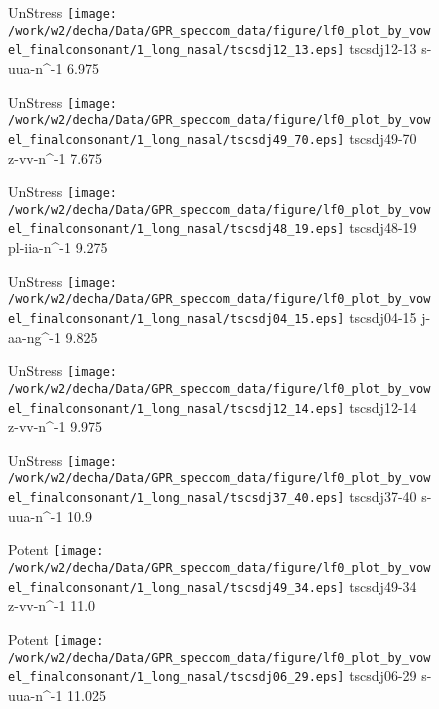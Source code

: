\documentclass{article}
\begin{document}
\begin{figure}[t]
\begin{minipage}[b]{.24\textwidth}
UnStress
\centering
\texttt{[image: /work/w2/decha/Data/GPR\_speccom\_data/figure/lf0\_plot\_by\_vowel\_finalconsonant/1\_long\_nasal/tscsdj12\_13.eps]}
tscsdj12-13 s-uua-n\textasciicircum-1 6.975
\end{minipage}
\begin{minipage}[b]{.24\textwidth}
UnStress
\centering
\texttt{[image: /work/w2/decha/Data/GPR\_speccom\_data/figure/lf0\_plot\_by\_vowel\_finalconsonant/1\_long\_nasal/tscsdj49\_70.eps]}
tscsdj49-70 z-vv-n\textasciicircum-1 7.675
\end{minipage}
\begin{minipage}[b]{.24\textwidth}
UnStress
\centering
\texttt{[image: /work/w2/decha/Data/GPR\_speccom\_data/figure/lf0\_plot\_by\_vowel\_finalconsonant/1\_long\_nasal/tscsdj48\_19.eps]}
tscsdj48-19 pl-iia-n\textasciicircum-1 9.275
\end{minipage}
\begin{minipage}[b]{.24\textwidth}
UnStress
\centering
\texttt{[image: /work/w2/decha/Data/GPR\_speccom\_data/figure/lf0\_plot\_by\_vowel\_finalconsonant/1\_long\_nasal/tscsdj04\_15.eps]}
tscsdj04-15 j-aa-ng\textasciicircum-1 9.825
\end{minipage}
\end{figure}

\begin{figure}[t]
\begin{minipage}[b]{.24\textwidth}
UnStress
\centering
\texttt{[image: /work/w2/decha/Data/GPR\_speccom\_data/figure/lf0\_plot\_by\_vowel\_finalconsonant/1\_long\_nasal/tscsdj12\_14.eps]}
tscsdj12-14 z-vv-n\textasciicircum-1 9.975
\end{minipage}
\begin{minipage}[b]{.24\textwidth}
UnStress
\centering
\texttt{[image: /work/w2/decha/Data/GPR\_speccom\_data/figure/lf0\_plot\_by\_vowel\_finalconsonant/1\_long\_nasal/tscsdj37\_40.eps]}
tscsdj37-40 s-uua-n\textasciicircum-1 10.9
\end{minipage}
\begin{minipage}[b]{.24\textwidth}
\colorbox{Apricot}{Potent}
\centering
\texttt{[image: /work/w2/decha/Data/GPR\_speccom\_data/figure/lf0\_plot\_by\_vowel\_finalconsonant/1\_long\_nasal/tscsdj49\_34.eps]}
tscsdj49-34 z-vv-n\textasciicircum-1 11.0
\end{minipage}
\begin{minipage}[b]{.24\textwidth}
\colorbox{Apricot}{Potent}
\centering
\texttt{[image: /work/w2/decha/Data/GPR\_speccom\_data/figure/lf0\_plot\_by\_vowel\_finalconsonant/1\_long\_nasal/tscsdj06\_29.eps]}
tscsdj06-29 s-uua-n\textasciicircum-1 11.025
\end{minipage}
\end{figure}
\end{document}
